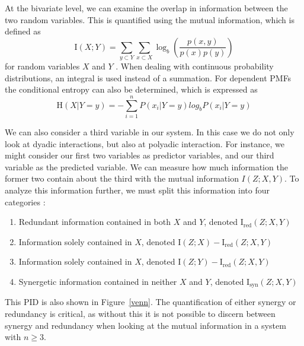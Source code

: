 \documentclass[../main.tex]{subfiles}
\begin{document}
At the bivariate level, we can examine the overlap in information between the two random variables.
This is quantified using the mutual information, which is defined as 
%
\begin{equation}
\label{MI}
\mathrm{I}(X;Y) = \sum_{y \subset Y} \sum_{x \subset X} \log_b (\frac{p(x,y)}{p(x) p(y)})
\end{equation}
%
for random variables $X$ and $Y$ \cite{cover2012elements}.
When dealing with continuous probability distributions, an integral is used instead of a summation.
For dependent PMFs the conditional entropy can also be determined, which is expressed as 
%
\begin{equation}
\mathrm{H}(X | Y = y) = -\sum^n_{i=1} P(x_i | Y = y) log_b P(x_i | Y = y)
\end{equation}
%

We can also consider a third variable in our system.
In this case we do not only look at dyadic interactions, but also at polyadic interaction.
For instance, we might consider our first two variables as predictor variables, and our third variable as the predicted variable.
We can measure how much information the former two contain about the third with the mutual information $I(Z;X,Y)$.
To analyze this information further, we must split this information into four categories \cite{williams2010nonnegative}:
%
\begin{enumerate}
\item Redundant information contained in both $X$ and $Y$, denoted $\mathrm{I}_\mathrm{red}(Z;X,Y)$
\item Information solely contained in $X$, denoted $\mathrm{I}(Z; X) - \mathrm{I}_\mathrm{red}(Z;X,Y)$
\item Information solely contained in $X$, denoted $\mathrm{I}(Z; Y) - \mathrm{I}_\mathrm{red}(Z;X,Y)$
\item Synergetic information contained in neither $X$ and $Y$, denoted $\mathrm{I}_\mathrm{syn}(Z;X,Y)$
\end{enumerate}
This PID is also shown in Figure~\ref{venn}.
The quantification of either synergy or redundancy is critical, as without this it is not possible to discern between synergy and redundancy when looking at the mutual information in a system with $n \ge 3$.

\def\firstcircle{(0:-0.9cm) circle (2cm)}
\def\secondcircle{(0:0cm) circle (3cm)}
\def\thirdcircle{(0:0.9cm) circle (2cm)}
\end{document}
